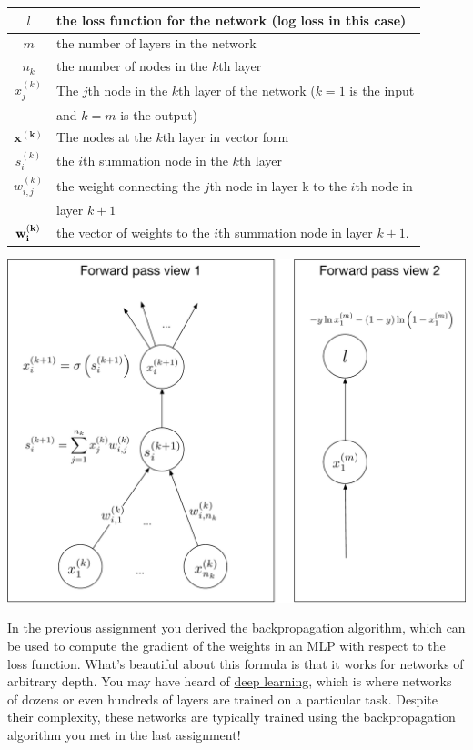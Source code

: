 \documentclass[assignment07_Solutions]{subfiles}
\begin{document}
\begin{recall}
\begin{tabular}{| c | l |}
\hline
$l$ & the loss function for the network (log loss in this case) \\
\hline
$m$ & the number of layers in the network \\
\hline
$n_{k}$ & the number of nodes in the $k$th layer \\
\hline
$x_j^{(k)}$& The $j$th node in the $k$th layer of the network ($k = 1$ is the input \\
&and $k = m$ is the output) \\
\hline
$\mathbf{x^{(k)}}$ & The nodes at the $k$th layer in vector form \\
\hline
$s_{i}^{(k)}$ & the $i$th summation node in the $k$th layer \\
\hline
$w_{i,j}^{(k)}$ & the weight connecting the $j$th node in layer k to the $i$th node in\\
&  layer $k+1$ \\
\hline
$\mathbf{w_{i}^{(k)}}$ & the vector of weights to the $i$th summation node in layer $k+1$.\\
\hline
\end{tabular}

\begin{center}
\includegraphics[width=0.7\linewidth]{figures/mlpfullforward}
\end{center}

\end{recall}

In the previous assignment you derived the backpropagation algorithm, which can be used to compute the gradient of the weights in an MLP with respect to the loss function.  What's beautiful about this formula is that it works for networks of arbitrary depth.  You may have heard of \href{https://en.wikipedia.org/wiki/Deep_learning}{deep learning}, which is where networks of dozens or even hundreds of layers are trained on a particular task.  Despite their complexity, these networks are typically trained using the backpropagation algorithm you met in the last assignment!
\end{document}
